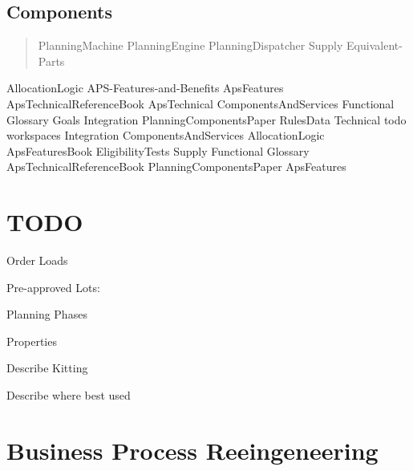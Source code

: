 \documentclass[letterpaper,10pt,english]{sphinxmanual}
\begin{document}
\section{Components}
\label{APS/index:components}\begin{quote}

PlanningMachine
PlanningEngine
PlanningDispatcher
Supply
Equivalent-Parts
\end{quote}

AllocationLogic
APS-Features-and-Benefits
ApsFeatures
ApsTechnicalReferenceBook
ApsTechnical
ComponentsAndServices
Functional
Glossary
Goals
Integration
PlanningComponentsPaper
RulesData
Technical
todo
workspaces
Integration
ComponentsAndServices
AllocationLogic
ApsFeaturesBook
EligibilityTests
Supply
Functional
Glossary
ApsTechnicalReferenceBook
PlanningComponentsPaper
ApsFeatures


\chapter{TODO}
\label{APS/todo:todo}\label{APS/todo::doc}
Order Loads

Pre-approved Lots:

Planning Phases

Properties

Describe Kitting

Describe where best used


\chapter{Business Process Reeingeneering}
\label{BusinessProcessReengineering::doc}\label{BusinessProcessReengineering:business-process-reeingeneering}
\end{document}
